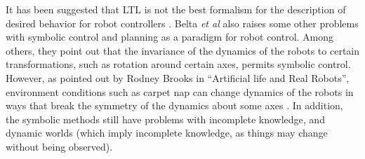 %	
%			
It has been suggested that LTL is not the best formalism for the description of desired behavior for robot controllers \citep{belta2007symbolic}.
Belta \emph{et al} also raises some other problems with symbolic control and planning as a paradigm for robot control. 
Among others, they point out that the invariance of the dynamics of the robots to certain transformations, such as rotation around certain axes, permits symbolic control. 
However, as pointed out by Rodney Brooks in ``Artificial life and Real Robots'', environment conditions such as carpet nap can change dynamics of the robots in ways that break the symmetry of the dynamics about some axes \citep{brooks1992artificial}.
In addition, the symbolic methods still have problems with incomplete knowledge, and dynamic worlds (which imply incomplete knowledge, as things may change without being observed). 
